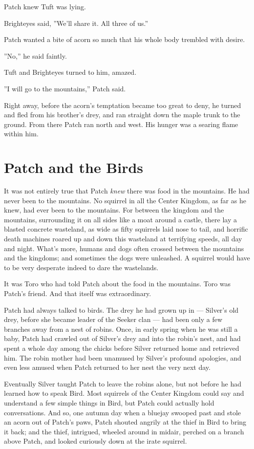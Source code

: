 \documentclass[12pt]{book}
\begin{document}
Patch knew Tuft was lying.

Brighteyes said, ''We'll share it. All three of us.''

Patch wanted a bite of acorn so much that his whole body trembled with
desire.

''No,'' he said faintly.

Tuft and Brighteyes turned to him, amazed.

''I will go to the mountains,'' Patch said.

Right away, before the acorn's temptation became too great to deny, he
turned and fled from his brother's drey, and ran straight down the
maple trunk to the ground. From there Patch ran north and west. His
hunger was a searing flame within him.


\section{Patch and the Birds}

It was not entirely true that Patch \textit{knew} there was food in
the mountains. He had never been to the mountains. No squirrel in all
the Center Kingdom, as far as he knew, had ever been to the
mountains. For between the kingdom and the mountains, surrounding it
on all sides like a moat around a castle, there lay a blasted concrete
wasteland, as wide as fifty squirrels laid nose to tail, and horrific
death machines roared up and down this wasteland at terrifying speeds,
all day and night. What's more, humans and dogs often crossed between
the mountains and the kingdoms; and sometimes the dogs were
unleashed. A squirrel would have to be very desperate indeed to dare
the wastelands.

It was Toro who had told Patch about the food in the mountains. Toro
was Patch's friend. And that itself was extraordinary.

Patch had always talked to birds. The drey he had grown up in ---
Silver's old drey, before she became leader of the Seeker clan --- had
been only a few branches away from a nest of robins. Once, in early
spring when he was still a baby, Patch had crawled out of Silver's
drey and into the robin's nest, and had spent a whole day among the
chicks before Silver returned home and retrieved him. The robin mother
had been unamused by Silver's profound apologies, and even less amused
when Patch returned to her nest the very next day.

Eventually Silver taught Patch to leave the robins alone, but not
before he had learned how to speak Bird. Most squirrels of the Center
Kingdom could say and understand a few simple things in Bird, but
Patch could actually hold conversations. And so, one autumn day when a
bluejay swooped past and stole an acorn out of Patch's paws, Patch
shouted angrily at the thief in Bird to bring it back; and the thief,
intrigued, wheeled around in midair, perched on a branch above Patch,
and looked curiously down at the irate squirrel.
\end{document}
